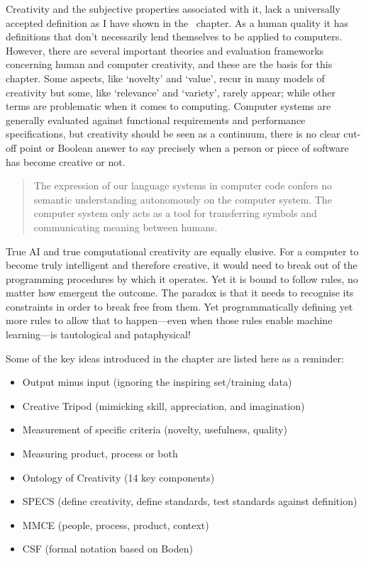 Creativity and the subjective properties associated with it, lack a universally accepted definition as I have shown in the~ chapter. As a human quality it has definitions that don't necessarily lend themselves to be applied to computers. However, there are several important theories and evaluation frameworks concerning human and computer creativity, and these are the basis for this chapter. Some aspects, like `novelty' and `value', recur in many models of creativity but some, like `relevance' and `variety', rarely appear; while other terms are problematic when it comes to computing. Computer systems are generally evaluated against functional requirements and performance specifications, but creativity should be seen as a continuum, there is no clear cut-off point or Boolean answer to say precisely when a person or piece of software has become creative or not.

\begin{quotation}
  The expression of our language systems in computer code confers no semantic understanding autonomously on the computer system. The computer system only acts as a tool for transferring symbols and communicating meaning between humans. 
\end{quotation}

True \ac{AI} and true computational creativity are equally elusive. For a computer to become truly intelligent and therefore creative, it would need to break out of the programming procedures by which it operates. Yet it is bound to follow rules, no matter how emergent the outcome. The paradox is that it needs to recognise its constraints in order to break free from them. Yet programmatically defining yet more rules to allow that to happen---even when those rules enable machine learning---is tautological and pataphysical!

\spirals

Some of the key ideas introduced in the  chapter are listed here as a reminder:

\begin{itemize}
  \item Output minus input (ignoring the inspiring set/training data)
  \item Creative Tripod (mimicking skill, appreciation, and imagination)
  \item Measurement of specific criteria (novelty, usefulness, quality)
  \item Measuring product, process or both
  \item Ontology of Creativity (14 key components)
  \item \ac{SPECS} (define creativity, define standards, test standards against definition)
  \item \ac{MMCE} (people, process, product, context)
  \item \ac{CSF} (formal notation based on Boden)
\end{itemize}



